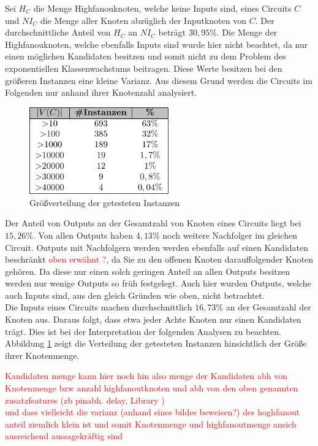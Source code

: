 \documentclass[11pt, a4paper, german]{article}
\begin{document}
Sei $H_C$ die Menge Highfanouknoten, welche keine Inputs sind, eines Circuits $C$ und $NI_C$ die Menge aller Knoten abz\"uglich der Inputknoten von $C$. Der durchschnittliche Anteil von $H_C$ an $NI_C$ betr\"agt $30,95\%$. Die Menge der Highfanouknoten, welche ebenfalls Inputs sind wurde hier nicht beachtet, da nur einen m\"oglichen Kandidaten besitzen und somit nicht zu dem Problem des exponentiellen Klassenwachstums beitragen. Diese Werte besitzen bei den gr\"o{\ss}eren Instanzen eine kleine Varianz. Aus diesem Grund werden die Circuits im Folgenden nur anhand ihrer Knotenzahl analysiert.\\
   \begin{figure}
		\includegraphics[width = 6cm]{pictures/compiled/instance_sizes_distribution_table}
		\caption{Gr\"o\ss verteilung der getesteten Instanzen}
		\label{bild:sizes_table}
	\end{figure}
 Der Anteil von Outputs an der Gesamtzahl von Knoten eines Circuits liegt bei $15,26\%$. Von allen Outputs haben $4,13\%$ noch weitere Nachfolger im gleichen Circuit. Outputs mit Nachfolgern werden werden ebenfalls auf einen Kandidaten beschr\"ankt \textcolor{red}{oben erw\"ahnt ?}, da Sie zu den offenen Knoten darauffolgender Knoten gehören. Da diese nur einen solch geringen Anteil an allen Outputs besitzen werden nur wenige Outputs so fr\"uh festgelegt. Auch hier wurden Outputs, welche auch Inputs sind, aus den gleich Gr\"unden wie oben, nicht betrachtet.\\
 Die Inputs eines Circuits machen durchschnittlich $16,73\%$ an der Gesamtzahl der Knoten aus. Daraus folgt, dass etwa jeder Achte Knoten nur einen Kandidaten tr\"agt. Dies ist bei der Interpretation der folgenden Analysen zu beachten.\\
 Abbildung \ref{bild:sizes_table} zeigt die Verteilung der getesteten Instanzen hinsichtlich der Größe  ihrer Knotenmenge.
 
\textcolor{red}{ Kandidaten menge kann hier noch hin also menge der Kandidaten abh von Knotenmenge bzw anzahl highfanoutknoten  und abh von den oben genannten zusatzfeatures (zb pinabh. delay, Library )  \\  und dass vielleicht die varianz (anhand eines bildes beweisen?) des hoghfanout anteil ziemlich klein ist und somit Knotenmenge und highfanoutmenge ansich ausreichend aussagekräftig sind} 
 
\end{document}
